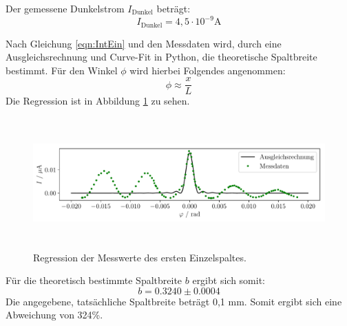 Der gemessene Dunkelstrom $I_\text{Dunkel}$ beträgt:
\begin{equation*}
	I_\text{Dunkel} = 4,5 \cdot 10^{-9} \text{A}
\end{equation*}

Nach Gleichung \ref{eqn:IntEin} und den Messdaten wird, durch eine Ausgleichsrechnung und Curve-Fit in Python, die theoretische Spaltbreite bestimmt. 
Für den Winkel $\phi$ wird hierbei Folgendes angenommen:
\begin{equation*}
	\phi \approx \frac{x}{L}
\end{equation*}
 Die Regression ist in Abbildung \ref{fig:Einzel1} zu sehen.
 
 \begin{figure}[h]
	\centering
	\includegraphics[height=5cm, width=15cm]{Auswertung/Graph_Einzelspalt1.pdf}
	\caption{Regression der Messwerte des ersten Einzelspaltes.}
	\label{fig:Einzel1}
\end{figure}
 
 Für die theoretisch bestimmte Spaltbreite $b$ ergibt sich somit:
 \begin{equation*}
 	b = 0.3240 \pm 0.0004
\end{equation*}
Die angegebene, tatsächliche Spaltbreite beträgt 0,1 mm. Somit ergibt sich eine Abweichung von 324\%.

